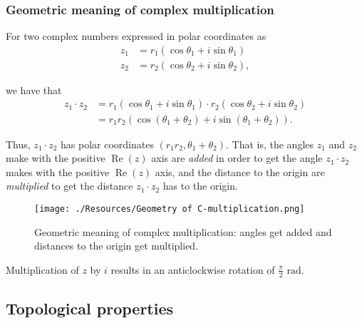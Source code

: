 \documentclass[12pt, a4paper]{article}
\DeclareMathOperator{\R}{Re}
\begin{document}
\subsubsection*{Geometric meaning of complex multiplication}

For two complex numbers expressed in polar coordinates as 
\[\begin{aligned}
    z_1 &= r_1 (\cos\theta_1+i\sin\theta_1) \\
    z_2 &= r_2(\cos\theta_2+i\sin\theta_2),
\end{aligned}\]

we have that 
\[\begin{aligned}
    z_1 \cdot z_2 &= r_1 (\cos\theta_1+i\sin\theta_1) \cdot r_2(\cos\theta_2+i\sin\theta_2) \\
    &= r_1 r_2 (\cos(\theta_1+\theta_2) +i\sin(\theta_1+\theta_2)).
\end{aligned}\]

Thus, \(z_1 \cdot z_2\) has polar coordinates \((r_1r_2, \theta_1+\theta_2)\). That is, the angles \(z_1\) and \(z_2\) make with the positive \(\R(z)\) axis are \textit{added} in order to get the angle \(z_1 \cdot z_2\) makes with the positive \(\R(z)\) axis, and the distance to the origin are \textit{multiplied} to get the distance \(z_1 \cdot z_2\) has to the origin.

\begin{figure}[H]
     \begin{center}
         \texttt{[image: ./Resources/Geometry of C-multiplication.png]}
     \end{center}
     \caption{Geometric meaning of complex multiplication: angles get added and distances to the origin get multiplied.}
\end{figure}

\begin{mdthm}
    Multiplication of \(z\) by \(i\) results in an anticlockwise rotation of \(\frac{\pi}{2} \text{ rad}\).
\end{mdthm}

\subsection{Topological properties}
\end{document}
